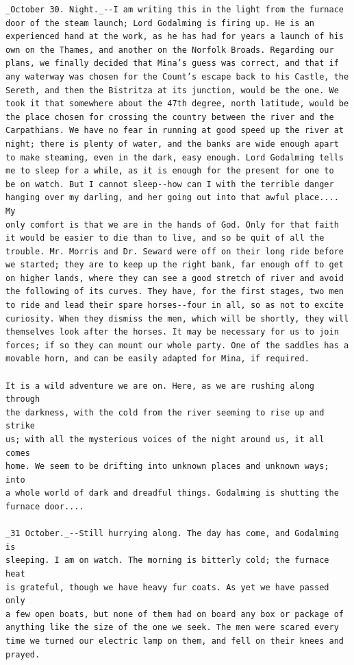 \documentclass{article}
\begin{document}
\begin{verbatim}
_October 30. Night._--I am writing this in the light from the furnace
door of the steam launch; Lord Godalming is firing up. He is an
experienced hand at the work, as he has had for years a launch of his
own on the Thames, and another on the Norfolk Broads. Regarding our
plans, we finally decided that Mina’s guess was correct, and that if
any waterway was chosen for the Count’s escape back to his Castle, the
Sereth, and then the Bistritza at its junction, would be the one. We
took it that somewhere about the 47th degree, north latitude, would be
the place chosen for crossing the country between the river and the
Carpathians. We have no fear in running at good speed up the river at
night; there is plenty of water, and the banks are wide enough apart
to make steaming, even in the dark, easy enough. Lord Godalming tells
me to sleep for a while, as it is enough for the present for one to
be on watch. But I cannot sleep--how can I with the terrible danger
hanging over my darling, and her going out into that awful place.... My
only comfort is that we are in the hands of God. Only for that faith
it would be easier to die than to live, and so be quit of all the
trouble. Mr. Morris and Dr. Seward were off on their long ride before
we started; they are to keep up the right bank, far enough off to get
on higher lands, where they can see a good stretch of river and avoid
the following of its curves. They have, for the first stages, two men
to ride and lead their spare horses--four in all, so as not to excite
curiosity. When they dismiss the men, which will be shortly, they will
themselves look after the horses. It may be necessary for us to join
forces; if so they can mount our whole party. One of the saddles has a
movable horn, and can be easily adapted for Mina, if required.

It is a wild adventure we are on. Here, as we are rushing along through
the darkness, with the cold from the river seeming to rise up and strike
us; with all the mysterious voices of the night around us, it all comes
home. We seem to be drifting into unknown places and unknown ways; into
a whole world of dark and dreadful things. Godalming is shutting the
furnace door....

_31 October._--Still hurrying along. The day has come, and Godalming is
sleeping. I am on watch. The morning is bitterly cold; the furnace heat
is grateful, though we have heavy fur coats. As yet we have passed only
a few open boats, but none of them had on board any box or package of
anything like the size of the one we seek. The men were scared every
time we turned our electric lamp on them, and fell on their knees and
prayed.


\end{verbatim}
\end{document}
